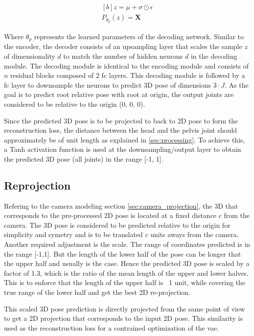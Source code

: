 \begin{equation} \label{eqn:P_fn}
    \begin{gathered}[b]
        z = \mu + \sigma \odot \epsilon \\
        P_{\theta_p}(z) = \textbf{X}
    \end{gathered}
\end{equation}

Where $\theta_p$ represents the learned parameters of the decoding network. Similar to the encoder, the decoder consists of an upsampling layer that scales the sample $z$ of dimensionality $d$ to match the number of hidden neurons $d$ in the decoding module. The decoding module is identical to the encoding module and consists of $n$ residual blocks composed of 2 \ac{fc} layers. This decoding module is followed by a \ac{fc} layer to downsample the neurons to predict 3D pose of dimensions $3\!\cdot\!J$. As the goal is to predict root relative pose with root at origin, the output joints are considered to be relative to the origin (0, 0, 0).

Since the predicted 3D pose is to be projected to back to 2D pose to form the reconstruction loss, the distance between the head and the pelvis joint should approximately be of unit length as explained in \ref{sec:processing}. To achieve this, a Tanh activation function is used at the downsampling/output layer to obtain the predicted 3D pose (all joints) in the range [-1, 1]. %

\subsection{Reprojection}
\label{subsec:reproject}
Refering to the camera modeling section \ref{sec:camera_projection}, the 3D that corresponds to the pre-processed 2D pose is located at a fixed distance $c$ from the camera. The 3D pose is considered to be predicted relative to the origin for simplicity and symetry and is to be translated $c$ units aways from the camera. Another required adjustment is the scale. The range of coordinates predicted is in the range [-1,1]. But the length of the lower half of the pose can be longer that the upper half and usually is the case. Hence the predicted 3D pose is scaled by a factor of 1.3, which is the ratio of the mean length of the upper and lower halves. This is to enforce that the length of the upper half is ~1 unit, while covering the true range of the lower half and get the best 2D re-projection.

This scaled 3D pose prediction is directly projected from the same point of view to get a 2D projection that corresponds to the input 2D pose. This similarity is used as the reconstruction loss for a contrained optimization of the \ac{vae}.

